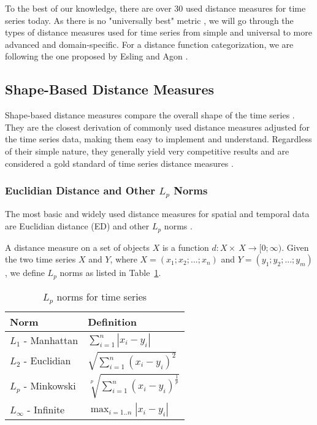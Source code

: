 To the best of our knowledge, there are over 30 used distance measures for time series today. As there is no "universally best" metric \cite{met:universal}, we will go through the types of distance measures used for time series from simple and universal to more advanced and domain-specific. For a distance function categorization, we are following the one proposed by Esling and Agon \cite{met:classification}.

\subsection{Shape-Based Distance Measures}
Shape-based distance measures compare the overall shape of the time series \cite{met:classification}. They are the closest derivation of commonly used distance measures adjusted for the time series data, making them easy to implement and understand. Regardless of their simple nature, they generally yield very competitive results and are considered a gold standard of time series distance measures \cite{met:comparison-new, met:dtw-best-0, met:dtw-best-1, met:universal, met:fDTW}.

\subsubsection{Euclidian Distance and Other $L_p$ Norms}
The most basic and widely used distance measures for spatial and temporal data are Euclidian distance (ED) and other $L_p$ norms \cite{met:lp-norm, met:lp-norm-usage}.

A distance measure on a set of objects $X$ is a function $d:X\times~X\rightarrow[0; \infty)$.
Given the two time series $X$ and $Y$, where $X=(x_1; x_2; ...; x_n)$ and $Y=(y_1; y_2;...; y_m)$, we define $L_p$ norms as listed in Table~\ref{tab:lp-norms}.
\begin{table}[!htbp]
\begin{tabular}{ll}
\textbf{Norm}          & \textbf{Definition}                               \\ \hline
$L_1$ - Manhattan      & $\sum^{n}_{i=1}|x_i - y_i|$                       \\
$L_2$ - Euclidian      & $\sqrt{\sum^{n}_{i=1}(x_i - y_i)^2}$              \\
$L_p$ - Minkowski      & $\sqrt[p]{\sum^{n}_{i=1}(x_i - y_i)^\frac{1}{p}}$ \\
$L_\infty$ - Infinite  & $\max_{i=1..n}|x_i - y_i|$
\end{tabular}
\caption{$L_p$ norms for time series}
\label{tab:lp-norms}
\end{table}

